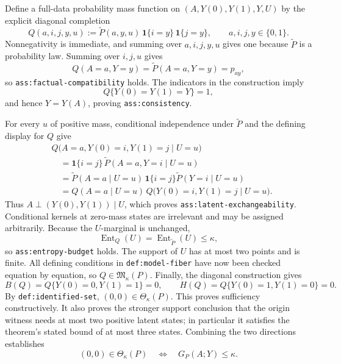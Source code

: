 Define a full-data probability mass function on \((A,Y(0),Y(1),Y,U)\) by the explicit diagonal completion
\[
Q(a,i,j,y,u)
:=\widetilde P(a,y,u)\,\mathbf 1\{i=y\}\,\mathbf 1\{j=y\},
\qquad a,i,j,y\in\{0,1\}.
\]
Nonnegativity is immediate, and summing over \(a,i,j,y,u\) gives one because \(\widetilde P\) is a probability law.  Summing over \(i,j,u\) gives
\[
Q(A=a,Y=y)=\widetilde P(A=a,Y=y)=p_{ay},
\]
so \texttt{ass:factual-compatibility} holds.  The indicators in the construction imply
\[
Q\{Y(0)=Y(1)=Y\}=1,
\]
and hence \(Y=Y(A)\), proving \texttt{ass:consistency}.

For every \(u\) of positive mass, conditional independence under \(\widetilde P\) and the defining display for \(Q\) give
\[
\begin{aligned}
&Q\bigl(A=a,Y(0)=i,Y(1)=j\mid U=u\bigr)\\
&\quad=\mathbf 1\{i=j\}\,
\widetilde P(A=a,Y=i\mid U=u)\\
&\quad=\widetilde P(A=a\mid U=u)\,
\mathbf 1\{i=j\}\widetilde P(Y=i\mid U=u)\\
&\quad=Q(A=a\mid U=u)\,
Q\bigl(Y(0)=i,Y(1)=j\mid U=u\bigr).
\end{aligned}
\]
Thus \(A\perp(Y(0),Y(1))\mid U\), which proves \texttt{ass:latent-exchangeability}.  Conditional kernels at zero-mass states are irrelevant and may be assigned arbitrarily.  Because the \(U\)-marginal is unchanged,
\[
\operatorname{Ent}_{Q}(U)=\operatorname{Ent}_{\widetilde P}(U)\leq\kappa,
\]
so \texttt{ass:entropy-budget} holds.  The support of \(U\) has at most two points and is finite.  All defining conditions in \texttt{def:model-fiber} have now been checked equation by equation, so \(Q\in\mathfrak M_\kappa(P)\).  Finally, the diagonal construction gives
\[
B(Q)=Q\{Y(0)=0,Y(1)=1\}=0,
\qquad
H(Q)=Q\{Y(0)=1,Y(1)=0\}=0.
\]
By \texttt{def:identified-set}, \((0,0)\in\Theta_\kappa(P)\).  This proves sufficiency constructively.  It also proves the stronger support conclusion that the origin witness needs at most two positive latent states; in particular it satisfies the theorem's stated bound of at most three states.  Combining the two directions establishes
\[
(0,0)\in\Theta_\kappa(P)
\quad\Longleftrightarrow\quad
G_P(A;Y)\leq\kappa.
\]